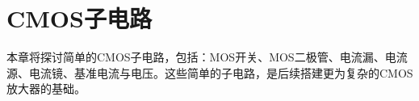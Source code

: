 \chapter{CMOS子电路}
本章将探讨简单的CMOS子电路，包括：MOS开关、MOS二极管、电流漏、电流源、电流镜、基准电流与电压。这些简单的子电路，是后续搭建更为复杂的CMOS放大器的基础。






